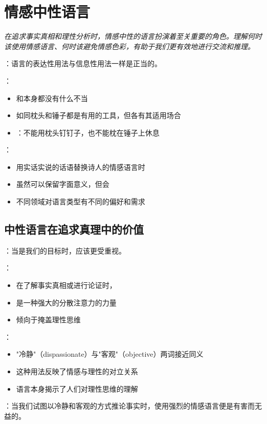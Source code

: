 \section{情感中性语言}

\begin{logicbox}[title=引言]
\textit{在追求事实真相和理性分析时，情感中性的语言扮演着至关重要的角色。理解何时该使用情感语言、何时该避免情感色彩，有助于我们更有效地进行交流和推理。}
\end{logicbox}

\begin{theorembox}[title=语言类型的正当性与适用性]
：语言的表达性用法与信息性用法一样是正当的。

：
\begin{itemize}
  \item {}和本身都没有什么不当
  \item 如同枕头和锤子都是有用的工具，但各有其适用场合
  \item {}：不能用枕头钉钉子，也不能枕在锤子上休息
\end{itemize}

：
\begin{itemize}
  \item 用实话实说的话语替换诗人的情感语言时
  \item 虽然可以保留字面意义，但会
  \item 不同领域对语言类型有不同的偏好和需求
\end{itemize}
\end{theorembox}

\subsection{中性语言在追求真理中的价值}

\begin{theorembox}[title=中性语言的优先领域]
：当是我们的目标时，应该更受重视。

：
\begin{itemize}
  \item 在了解事实真相或进行论证时，
  \item {}是一种强大的分散注意力的力量
  \item {}倾向于掩盖理性思维
\end{itemize}

：
\begin{itemize}
  \item "冷静"（dispassionate）与"客观"（objective）两词接近同义
  \item 这种用法反映了情感与理性的对立关系
  \item 语言本身揭示了人们对理性思维的理解
\end{itemize}

：当我们试图以冷静和客观的方式推论事实时，使用强烈的情感语言便是有害而无益的。
\end{theorembox}

